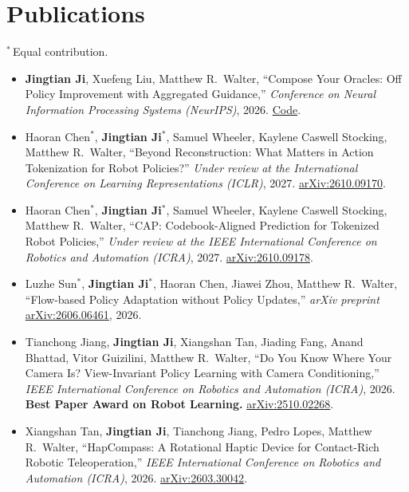 \documentclass[10pt,letterpaper]{article}
\newcommand{\me}{\textbf{Jingtian Ji}}
\newcommand{\eq}{$^{*}$}
\begin{document}
\section{Publications}
{\small $^{*}$\,Equal contribution.}
\begin{itemize}
  \item \me, Xuefeng Liu, Matthew R.\ Walter, ``Compose Your Oracles: Off Policy Improvement with Aggregated Guidance,'' \textit{Conference on Neural Information Processing Systems (NeurIPS)}, 2026. \href{https://github.com/LucienJi/OPI}{Code}.

  \item Haoran Chen\eq, \me\eq, Samuel Wheeler, Kaylene Caswell Stocking, Matthew R.\ Walter, ``Beyond Reconstruction: What Matters in Action Tokenization for Robot Policies?'' \textit{Under review at the International Conference on Learning Representations (ICLR)}, 2027. \href{https://arxiv.org/abs/2610.09170}{arXiv:2610.09170}.

  \item Haoran Chen\eq, \me\eq, Samuel Wheeler, Kaylene Caswell Stocking, Matthew R.\ Walter, ``CAP: Codebook-Aligned Prediction for Tokenized Robot Policies,'' \textit{Under review at the IEEE International Conference on Robotics and Automation (ICRA)}, 2027. \href{https://arxiv.org/abs/2610.09178}{arXiv:2610.09178}.

  \item Luzhe Sun\eq, \me\eq, Haoran Chen, Jiawei Zhou, Matthew R.\ Walter, ``Flow-based Policy Adaptation without Policy Updates,'' \textit{arXiv preprint} \href{https://arxiv.org/abs/2606.06461}{arXiv:2606.06461}, 2026.

  \item Tianchong Jiang, \me, Xiangshan Tan, Jiading Fang, Anand Bhattad, Vitor Guizilini, Matthew R.\ Walter, ``Do You Know Where Your Camera Is? View-Invariant Policy Learning with Camera Conditioning,'' \textit{IEEE International Conference on Robotics and Automation (ICRA)}, 2026. \textbf{Best Paper Award on Robot Learning.} \href{https://arxiv.org/abs/2510.02268}{arXiv:2510.02268}.

  \item Xiangshan Tan, \me, Tianchong Jiang, Pedro Lopes, Matthew R.\ Walter, ``HapCompass: A Rotational Haptic Device for Contact-Rich Robotic Teleoperation,'' \textit{IEEE International Conference on Robotics and Automation (ICRA)}, 2026. \href{https://arxiv.org/abs/2603.30042}{arXiv:2603.30042}.


\end{itemize}
\end{document}
